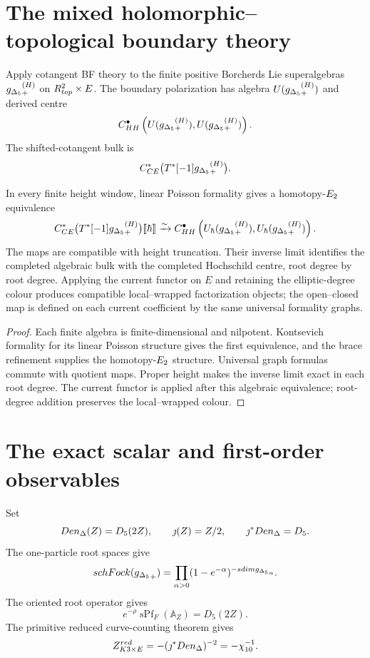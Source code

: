 \chapter{The mixed holomorphic--topological boundary theory}
Apply cotangent BF theory to the finite positive Borcherds Lie superalgebras ${g_{\Delta_5}}_+^{(H)}$ on $R^2_{top}\times E$.  The boundary polarization has algebra $U({g_{\Delta_5}}_+^{(H)})$ and derived centre
\[
 C^\bullet_{HH}
 \left(U({g_{\Delta_5}}_+^{(H)}),U({g_{\Delta_5}}_+^{(H)})\right).
\]
The shifted-cotangent bulk is
\[
 C^*_{CE}\bigl(T^*[-1]{g_{\Delta_5}}_+^{(H)}\bigr).
\]

\begin{theorem}
In every finite height window, linear Poisson formality gives a homotopy-$E_2$ equivalence
\[
 C^*_{CE}\bigl(T^*[-1]{g_{\Delta_5}}_+^{(H)}\bigr)\llbracket\hbar\rrbracket
 \xrightarrow{\sim}
 C^\bullet_{HH}
 \left(U_\hbar({g_{\Delta_5}}_+^{(H)}),U_\hbar({g_{\Delta_5}}_+^{(H)})\right).
\]
The maps are compatible with height truncation.  Their inverse limit identifies the completed algebraic bulk with the completed Hochschild centre, root degree by root degree.  Applying the current functor on $E$ and retaining the elliptic-degree colour produces compatible local--wrapped factorization objects; the open--closed map is defined on each current coefficient by the same universal formality graphs.
\end{theorem}
\begin{proof}
Each finite algebra is finite-dimensional and nilpotent.  Kontsevich formality for its linear Poisson structure gives the first equivalence, and the brace refinement supplies the homotopy-$E_2$ structure.  Universal graph formulas commute with quotient maps.  Proper height makes the inverse limit exact in each root degree.  The current functor is applied after this algebraic equivalence; root-degree addition preserves the local--wrapped colour.
\end{proof}

\chapter{The exact scalar and first-order observables}
Set
\[
 Den_{\Delta}(Z)=D_5(2Z),
 \qquad \jmath(Z)=Z/2,
 \qquad \jmath^*Den_{\Delta}=D_5.
\]
The one-particle root spaces give
\[
 schFock({g_{\Delta_5}}_+)
 =\prod_{\alpha>0}(1-e^{-\alpha})^{-sdim{g_{\Delta_5}}_\alpha}.
\]
The oriented root operator gives
\[
 e^{-\rho}\operatorname{sPf}_F(\mathbb A_Z)=D_5(2Z).
\]
The primitive reduced curve-counting theorem gives
\[
 Z^{red}_{K3\times E}=-(\jmath^*Den_{\Delta})^{-2}=-\chi_{10}^{-1}.
\]

